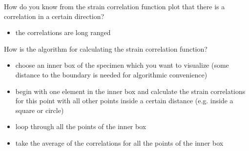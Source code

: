 \documentclass[english]{scrartcl}
\newenvironment{myitemize}{ \begin{itemize}
		\setlength{\itemsep}{0pt}
		\setlength{\parskip}{0pt}
		\setlength{\parsep}{0pt}     }
	{ \end{itemize}                  }
\begin{document}
How do you know from the strain correlation function plot that there is a correlation in a certain direction?
\begin{myitemize}
	\item the correlations are long ranged
\end{myitemize}

How is the algorithm for calculating the strain correlation function?
\begin{myitemize}
	\item choose an inner box of the specimen which you want to visualize (some distance to the boundary is needed for algorithmic convenience)
	\item begin with one element in the inner box and calculate the strain correlations for this point with all other points inside a certain distance (e.g. inside a square or circle)
	\item loop through all the points of the inner box
	\item take the average of the correlations for all the points of the inner box
\end{myitemize}
\end{document}
